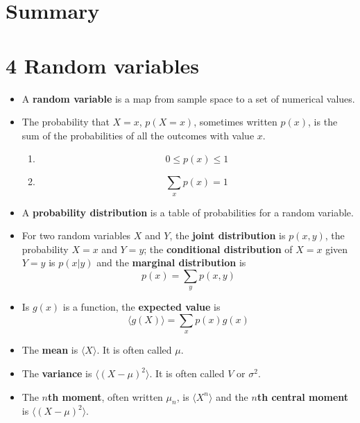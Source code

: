 
\ifind
\section*{Summary}
\else
\section*{4 Random variables}
\fi


\begin{itemize}
\item A \textbf{random variable} is a map from sample space to a set of numerical values.
\item The probability that $X=x$, $p(X=x)$, sometimes written $p(x)$,
  is the sum of the probabilities of all the outcomes with value $x$.
  \begin{enumerate}
    \item \begin{equation}
0\le p(x)\le 1
\end{equation}
\item 
\begin{equation}
\sum_x{p(x)}=1
\end{equation}
\end{enumerate}

\item A \textbf{probability distribution} is a table of probabilities for a random variable.

\item For two random variables $X$ and $Y$, the \textbf{joint distribution} is $p(x,y)$, the probability $X=x$ and $Y=y$; the \textbf{conditional distribution} of $X=x$ given $Y=y$ is $p(x|y)$ and the \textbf{marginal distribution} is
  \begin{equation}
    p(x)=\sum_{y}p(x,y)
  \end{equation}

\item Is $g(x)$ is a function, the \textbf{expected value} is
  \begin{equation}
\langle g(X)\rangle = \sum_x p(x)g(x)
  \end{equation}

\item The \textbf{mean} is $\langle X\rangle$. It is often called $\mu$.

\item The \textbf{variance} is $\langle (X-\mu)^2\rangle$. It is often called $V$ or $\sigma^2$.

\item The \textbf{$n$th moment}, often written $\mu_n$, is $\langle X^n\rangle$ and the \textbf{$n$th central moment} is $\langle (X-\mu)^2\rangle$.


\end{itemize}
